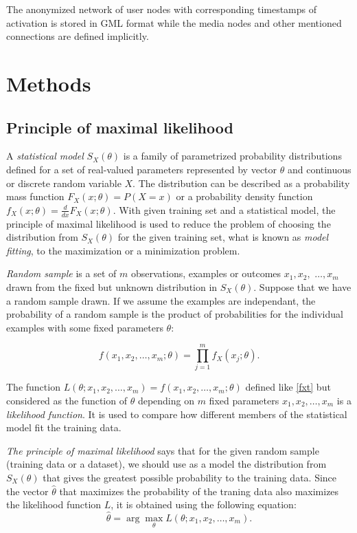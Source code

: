 \documentclass[times, utf8, zavrsni]{fer}
\newcommand{\argmax}{\arg\!\max}
\begin{document}
The anonymized network of user nodes with corresponding timestamps of activation is stored in GML format \cite{gml} while the media nodes and other mentioned connections are defined implicitly.
  
\chapter{Methods}
\section{Principle of maximal likelihood}

A \emph{statistical model} $S_X(\theta)$ is a family of parametrized probability distributions defined for a set of real-valued parameters represented by vector $\theta$ and continuous or discrete random variable $X$. The distribution can be described  as a probability mass function $F_X(x;\theta) = P(X = x)$ or a probability density function $f_X(x;\theta) = \frac{d}{dx}F_X(x;\theta)$. With given training set and a statistical model, the principle of maximal likelihood is used to reduce the problem of choosing the distribution from $S_X(\theta)$ for the given training set, what is known as \emph{model fitting}, to the maximization or a minimization problem.

 \emph{Random sample} is a set of $m$ observations, examples or outcomes $x_1, x_2,$ $\dots, x_m$ drawn from the fixed but unknown distribution in $S_X(\theta)$. Suppose that we have a random sample drawn. If we assume the examples are independant, the probability of a random sample is the product of probabilities for the individual examples with some fixed parameters $\theta$:

\begin{equation}
\label{fxt}
 f(x_1, x_2, \dots, x_m; \theta) = \prod_{j=1}^{m}{f_{X}(x_j; \theta )}. 
\end{equation}

The function $L(\theta; x_1, x_2, \dots, x_m) = f(x_1, x_2, \dots, x_m; \theta)$ defined like \eqref{fxt} but considered as the function of $\theta$ depending on $m$ fixed parameters $x_1, x_2, \dots, x_m$ is a \emph{likelihood function}. It is used to compare how different members of the statistical model fit the training data. 

\emph{The principle of maximal likelihood} says that for the given random sample (training data or a dataset), we should use as a model the distribution from $S_X(\theta)$ that gives the greatest possible probability to the training data. Since the vector $\hat\theta$ that maximizes the probability of the traning data also maximizes the likelihood function $L$, it is obtained using the following equation:
\begin{equation}
\label{MLE}
 \hat\theta = \argmax_{\theta} L(\theta; x_1, x_2, \dots, x_m).
\end{equation}
\end{document}

